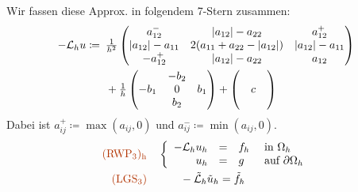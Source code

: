\documentclass{cheat-sheet}
\newcommand{\bOmega}{\partial \Omega} %
\newcommand{\LL}{\mathcal{L}} %
\newcommand{\tss}[1]{\textsubscript{#1}} %
\newcommand{\probl}[1]{\textcolor{ProblemColor}{#1}}
\begin{document}
\begin{verf}
  \iffalse
  Insgesamt haben wir als Approximation
  \begin{align*}
    - \LL u(x, y) & \approx \tfrac{1}{h^2} \left( (-a_{11} + \abs{a_{12}} + \nicefrac{h}{2} b_1) u(x-h, y) \right. \\
    & + (-a_{11} + \abs{a_{12}} - \nicefrac{h}{2} b_1) u(x + h, y) \\
    & + (2 a_{11} + 2 a_{22} - 2 \abs{a_{12}} + h^2 c) u(x, y) \\
    & + (-a_{22} + \abs{a_{12}} + \nicefrac{h}{2} b_2) u(x, y-h) \\
    & + (-a_{22} + \abs{a_{12}} - \nicefrac{h}{2} b_2) u(x, y+h) \\
    & + (- \max(a_{12}, 0) u(x-h, y-h) \\
    & + (- \max(a_{12}, 0)) u(x+h, y+h) \\
    & + \min(a_{12}, 0) u(x-h, y+h) \\
    & \left. + \min(a_{12}, 0) u(x + h, x - h)) \right)
  \end{align*}
  \fi
  
  Wir fassen diese Approx. in folgendem 7-Stern zusammen:
  \begin{align*}
    - \LL_h u \coloneqq \enspace
    & \tfrac{1}{h^2} \begin{pmatrix}
      a_{12}^{-} & \abs{a_{12}} - a_{22} & a_{12}^{+} \\
      \abs{a_{12}} - a_{11} & 2 (a_{11} + a_{22} - \abs{a_{12}}) & \abs{a_{12}} - a_{11} \\
      - a_{12}^{+} & \abs{a_{12}} - a_{22} & a_{12}
    \end{pmatrix} \\
    & + \tfrac{1}{h} \begin{pmatrix}
      & - b_2 \\
      - b_1 & 0 & b_1 \\
      & b_2
    \end{pmatrix}
    + \begin{pmatrix}
      \\ & c & \\ &
    \end{pmatrix}
  \end{align*}
  Dabei ist $a_{ij}^{+} \coloneqq \max(a_{ij}, 0)$ und $a_{ij}^{-} \coloneqq \min(a_{ij}, 0)$.
  \begin{align*}
    \text{\probl{(RWP\tss{3})\tss{h}}} \quad
    & \left\{ \begin{array}{rlll}
      - \LL_h u_h &=& f_h &\text{ in $\Omega_h$} \\
      u_h &=& g &\text{ auf $\bOmega_h$}
    \end{array} \right. \\
    \text{\probl{(LGS\tss{3})}} \quad
    & \qquad - \tilde{\LL}_h \tilde{u}_h = \tilde{f}_h
  \end{align*}
\end{verf}
\end{document}

